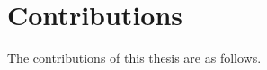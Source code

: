 \section{Contributions}
\label{sec:contribution}

The contributions of this thesis are as follows.

